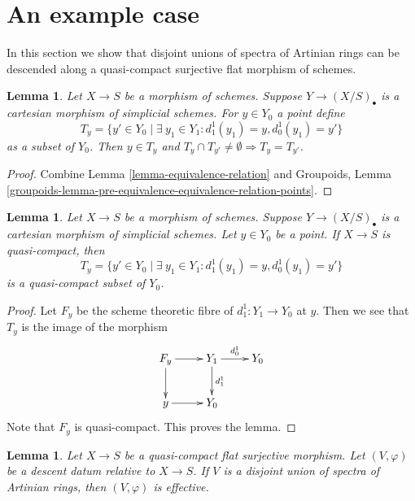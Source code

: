 \documentclass{stacks-project}
\theoremstyle{plain}
\newtheorem{lemma}[subsection]{Lemma}
\theoremstyle{definition}
\theoremstyle{remark}
\numberwithin{equation}{subsection}
\begin{document}
\section{An example case}
\label{section-example}

\noindent
In this section we show that disjoint unions of spectra
of Artinian rings can be descended along a quasi-compact
surjective flat morphism of schemes.

\begin{lemma}
\label{lemma-equivalence-classes-points}
Let $X \to S$ be a morphism of schemes. Suppose $Y \to (X/S)_\bullet$
is a cartesian morphism of simplicial schemes. For $y \in Y_0$ a point define
$$
T_y = \{y' \in Y_0 \mid \exists\ y_1 \in Y_1:
d^1_1(y_1) = y, d^1_0(y_1) = y'\}
$$
as a subset of $Y_0$. Then $y \in T_y$ and
$T_y \cap T_{y'} \not = \emptyset \Rightarrow T_y = T_{y'}$.
\end{lemma}

\begin{proof}
Combine Lemma \ref{lemma-equivalence-relation} and
Groupoids, Lemma
\ref{groupoids-lemma-pre-equivalence-equivalence-relation-points}.
\end{proof}

\begin{lemma}
\label{lemma-quasi-compact}
Let $X \to S$ be a morphism of schemes.
Suppose $Y \to (X/S)_\bullet$ is a cartesian morphism of simplicial schemes.
Let $y \in Y_0$ be a point. If $X \to S$ is quasi-compact, then
$$
T_y = \{y' \in Y_0 \mid \exists\ y_1 \in Y_1:
d^1_1(y_1) = y, d^1_0(y_1) = y'\}
$$
is a quasi-compact subset of $Y_0$.
\end{lemma}

\begin{proof}
Let $F_y$ be the scheme theoretic fibre of $d^1_1 : Y_1 \to Y_0$
at $y$. Then we see that $T_y$ is the image of the morphism
$$
\xymatrix{
F_y \ar[r] \ar[d] &
Y_1 \ar[r]^{d^1_0} \ar[d]^{d^1_1} &
Y_0 \\
y \ar[r] &
Y_0 &
}
$$
Note that $F_y$ is quasi-compact. This proves the lemma.
\end{proof}

\begin{lemma}
\label{lemma-descent-disjoint-union-Artinian-along-fields}
Let $X \to S$ be a quasi-compact flat surjective morphism.
Let $(V, \varphi)$ be a descent datum relative
to $X \to S$. If $V$ is a disjoint union of
spectra of Artinian rings, then $(V, \varphi)$ is effective.
\end{lemma}
\end{document}
